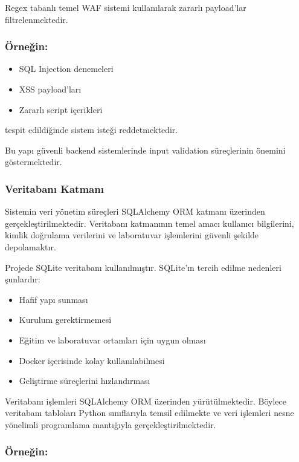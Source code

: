 Regex tabanlı temel WAF sistemi kullanılarak zararlı payload’lar filtrelenmektedir.

\subsubsection{Örneğin:}

\begin{itemize}[leftmargin=*]
    \item SQL Injection denemeleri
    \item XSS payload’ları
    \item Zararlı script içerikleri
\end{itemize}

tespit edildiğinde sistem isteği reddetmektedir.

Bu yapı güvenli backend sistemlerinde input validation süreçlerinin önemini göstermektedir.

\subsubsection{Veritabanı Katmanı}

Sistemin veri yönetim süreçleri SQLAlchemy ORM katmanı üzerinden gerçekleştirilmektedir. Veritabanı katmanının temel amacı kullanıcı bilgilerini, kimlik doğrulama verilerini ve laboratuvar işlemlerini güvenli şekilde depolamaktır.

Projede SQLite veritabanı kullanılmıştır. SQLite’ın tercih edilme nedenleri şunlardır:

\begin{itemize}[leftmargin=*]
    \item Hafif yapı sunması
    \item Kurulum gerektirmemesi
    \item Eğitim ve laboratuvar ortamları için uygun olması
    \item Docker içerisinde kolay kullanılabilmesi
    \item Geliştirme süreçlerini hızlandırması
\end{itemize}

Veritabanı işlemleri SQLAlchemy ORM üzerinden yürütülmektedir. Böylece veritabanı tabloları Python sınıflarıyla temsil edilmekte ve veri işlemleri nesne yönelimli programlama mantığıyla gerçekleştirilmektedir.

\subsubsection{Örneğin:}

